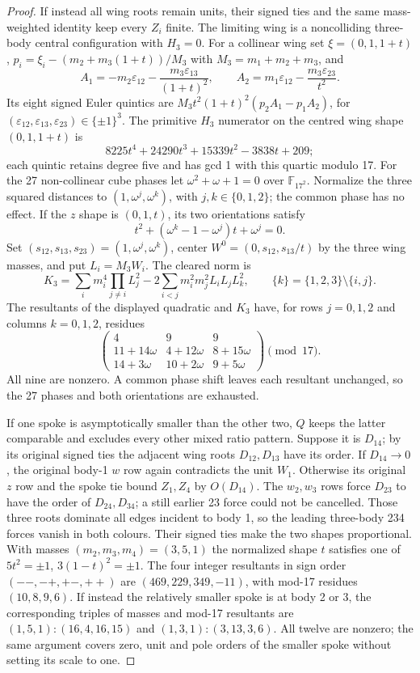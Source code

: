 \documentclass[11pt]{amsart}
\theoremstyle{remark}
\begin{document}
\begin{proof}
If instead all wing roots remain units, their signed ties and the same mass-weighted identity keep every $Z_i$ finite. The limiting wing is a noncolliding three-body central configuration with $H_3=0$. For a collinear wing set $\xi=(0,1,1+t)$, $p_i=\xi_i-(m_2+m_3(1+t))/M_3$ with $M_3=m_1+m_2+m_3$, and
\[
A_1=-m_2\varepsilon_{12}-\frac{m_3\varepsilon_{13}}{(1+t)^2},
\qquad A_2=m_1\varepsilon_{12}-\frac{m_3\varepsilon_{23}}{t^2}.
\]
Its eight signed Euler quintics are $M_3t^2(1+t)^2(p_2A_1-p_1A_2)$, for $(\varepsilon_{12},\varepsilon_{13},\varepsilon_{23})\in\{\pm1\}^3$. The primitive $H_3$ numerator on the centred wing shape $(0,1,1+t)$ is
\[
8225t^4+24290t^3+15339t^2-3838t+209;
\]
each quintic retains degree five and has gcd 1 with this quartic modulo 17. For the 27 non-collinear cube phases let $\omega^2+\omega+1=0$ over $\mathbb F_{17^2}$. Normalize the three squared distances to $(1,\omega^j,\omega^k)$, with $j,k\in\{0,1,2\}$; the common phase has no effect. If the $z$ shape is $(0,1,t)$, its two orientations satisfy
\[
t^2+(\omega^k-1-\omega^j)t+\omega^j=0.
\]
Set $(s_{12},s_{13},s_{23})=(1,\omega^j,\omega^k)$, center $W^0=(0,s_{12},s_{13}/t)$ by the three wing masses, and put $L_i=M_3W_i$. The cleared norm is
\[
K_3=\sum_i m_i^4\prod_{j\ne i}L_j^2
-2\sum_{i<j}m_i^2m_j^2L_iL_jL_k^2,
\qquad\{k\}=\{1,2,3\}\setminus\{i,j\}.
\]
The resultants of the displayed quadratic and $K_3$ have, for rows $j=0,1,2$ and columns $k=0,1,2$, residues
\[
\begin{pmatrix}
4&9&9\\
11+14\omega&4+12\omega&8+15\omega\\
14+3\omega&10+2\omega&9+5\omega
\end{pmatrix}\pmod{17}.
\]
All nine are nonzero. A common phase shift leaves each resultant unchanged, so the 27 phases and both orientations are exhausted.

If one spoke is asymptotically smaller than the other two, $Q$ keeps the latter comparable and excludes every other mixed ratio pattern. Suppose it is $D_{14}$; by its original signed ties the adjacent wing roots $D_{12},D_{13}$ have its order. If $D_{14}\to0$, the original body-1 $w$ row again contradicts the unit $W_1$. Otherwise its original $z$ row and the spoke tie bound $Z_1,Z_4$ by $O(D_{14})$. The $w_2,w_3$ rows force $D_{23}$ to have the order of $D_{24},D_{34}$; a still earlier 23 force could not be cancelled. Those three roots dominate all edges incident to body 1, so the leading three-body 234 forces vanish in both colours. Their signed ties make the two shapes proportional. With masses $(m_2,m_3,m_4)=(3,5,1)$ the normalized shape $t$ satisfies one of $5t^2=\pm1$, $3(1-t)^2=\pm1$. The four integer resultants in sign order $(--,-+,+-,++)$ are $(469,229,349,-11)$, with mod-17 residues $(10,8,9,6)$. If instead the relatively smaller spoke is at body 2 or 3, the corresponding triples of masses and mod-17 resultants are $(1,5,1):(16,4,16,15)$ and $(1,3,1):(3,13,3,6)$. All twelve are nonzero; the same argument covers zero, unit and pole orders of the smaller spoke without setting its scale to one.


\end{proof}
\end{document}
